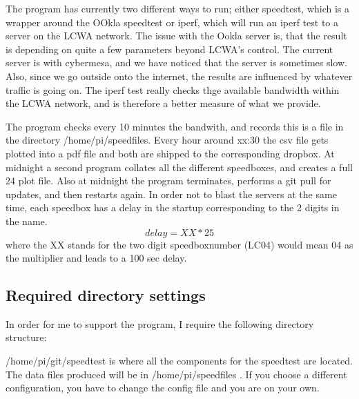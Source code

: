 \documentclass[12pt]{article}
\begin{document}
The program has currently two different ways to run; either speedtest, which is a wrapper around the OOkla speedtest  or iperf, which will run an iperf test to a server on the LCWA network. The issue with the Ookla server is, that the result is depending on quite a few parameters beyond LCWA's control. The current server is with cybermesa,
and we have noticed that the server is sometimes slow. Also, since we go outside onto the internet, the results are  influenced by whatever traffic is going on. The iperf test really checks thge available bandwidth within the LCWA network, and is therefore a better measure of what we provide.

The program checks every 10 minutes the bandwith, and records this is a file in the directory /home/pi/speedfiles. Every hour around xx:30 the csv file gets plotted into a pdf file and both are shipped to the corresponding dropbox.
At midnight a second program collates all the different speedboxes, and creates a full 24 plot file. Also at midnight the program terminates, performs a git pull for updates, and then restarts again. In order not to blast the servers at the same time, each speedbox has a delay in the startup corresponding to the 2 digits in the name.
\begin{equation}
delay = XX*25
\end{equation}
where the XX stands for the two digit speedboxnumber (LC04) would mean 04  as the multiplier and leads to a 100 sec delay.

\subsection{Required directory settings}

In order for me to support the program, I require the following directory structure:

/home/pi/git/speedtest is where all the components for the speedtest are located. The data files produced will be in /home/pi/speedfiles . If you choose a different configuration, you have to change the config file and you are on your own.
 
\end{document}
